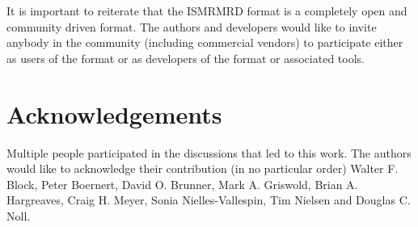 \documentclass[12pt]{article}
\begin{document}
It is important to reiterate that the ISMRMRD format is a completely open and community driven format. The authors and developers would like to invite anybody in the community (including commercial vendors) to participate either as users of the format or as developers of the format or associated tools.

\section*{Acknowledgements}
Multiple people participated in the discussions that led to this work.  The authors would like to acknowledge their contribution (in no particular order) 
Walter F. Block,
Peter Boernert,
David O. Brunner,
Mark A. Griswold,
Brian A. Hargreaves,
Craig H. Meyer,
Sonia Nielles-Vallespin,
Tim Nielsen and 
Douglas C. Noll.



\end{document}
